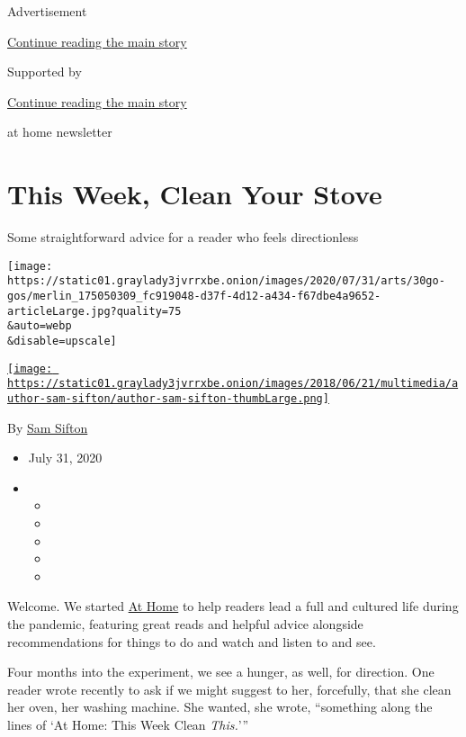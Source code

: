 Advertisement

\protect\hyperlink{after-top}{Continue reading the main story}

Supported by

\protect\hyperlink{after-sponsor}{Continue reading the main story}

at home newsletter

\hypertarget{this-week-clean-your-stove}{%
\section{This Week, Clean Your Stove}\label{this-week-clean-your-stove}}

Some straightforward advice for a reader who feels directionless

\texttt{[image: https://static01.graylady3jvrrxbe.onion/images/2020/07/31/arts/30go-gos/merlin\_175050309\_fc919048-d37f-4d12-a434-f67dbe4a9652-articleLarge.jpg?quality=75\\\&auto=webp\\\&disable=upscale]}

\href{https://www.nytimes3xbfgragh.onion/by/sam-sifton}{\texttt{[image: https://static01.graylady3jvrrxbe.onion/images/2018/06/21/multimedia/author-sam-sifton/author-sam-sifton-thumbLarge.png]}}

By \href{https://www.nytimes3xbfgragh.onion/by/sam-sifton}{Sam Sifton}

\begin{itemize}
\item
  July 31, 2020
\item
  \begin{itemize}
  \item
  \item
  \item
  \item
  \item
  \end{itemize}
\end{itemize}

Welcome. We started
\href{https://www.nytimes3xbfgragh.onion/spotlight/at-home}{At Home} to
help readers lead a full and cultured life during the pandemic,
featuring great reads and helpful advice alongside recommendations for
things to do and watch and listen to and see.

Four months into the experiment, we see a hunger, as well, for
direction. One reader wrote recently to ask if we might suggest to her,
forcefully, that she clean her oven, her washing machine. She wanted,
she wrote, ``something along the lines of `At Home: This Week Clean
\emph{This.}'''

